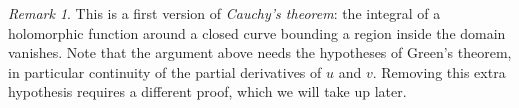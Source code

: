 \documentclass[11pt]{article}
\theoremstyle{plain}
\theoremstyle{definition}
\theoremstyle{remark}
\newtheorem*{remark}{Remark}
\numberwithin{equation}{section}
\begin{document}
\begin{remark}
This is a first version of \emph{Cauchy's theorem}: the integral of a
holomorphic function around a closed curve bounding a region inside the
domain vanishes. Note that the argument above needs the hypotheses of
Green's theorem, in particular continuity of the partial derivatives of $u$
and $v$. Removing this extra hypothesis requires a different proof, which we
will take up later.
\end{remark}
\end{document}

